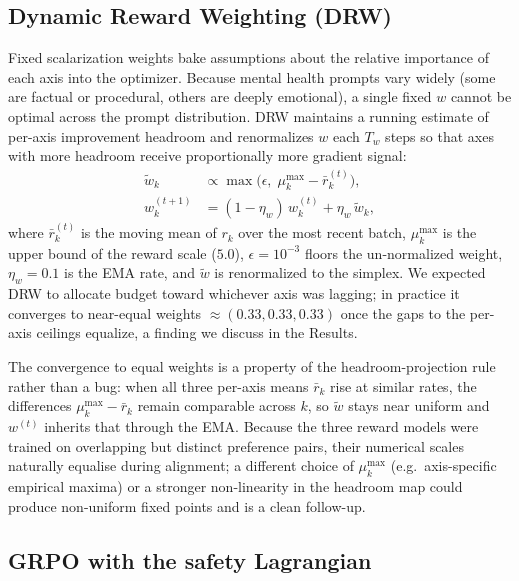\documentclass[10pt,twocolumn]{article}
\begin{document}
\subsection{Dynamic Reward Weighting (DRW)}

Fixed scalarization weights bake assumptions about the relative importance of each axis into the optimizer. Because mental health prompts vary widely (some are factual or procedural, others are deeply emotional), a single fixed $w$ cannot be optimal across the prompt distribution. DRW maintains a running estimate of per-axis improvement headroom and renormalizes $w$ each $T_w$ steps so that axes with more headroom receive proportionally more gradient signal:
\begin{align*}
  \tilde{w}_k &\propto \max\bigl(\epsilon,\; \mu_k^{\max} - \bar{r}_k^{(t)}\bigr), \\
  w_k^{(t+1)} &= (1 - \eta_w)\, w_k^{(t)} + \eta_w\, \tilde{w}_k,
\end{align*}
where $\bar{r}_k^{(t)}$ is the moving mean of $r_k$ over the most recent batch, $\mu_k^{\max}$ is the upper bound of the reward scale ($5.0$), $\epsilon = 10^{-3}$ floors the un-normalized weight, $\eta_w = 0.1$ is the EMA rate, and $\tilde{w}$ is renormalized to the simplex. We expected DRW to allocate budget toward whichever axis was lagging; in practice it converges to near-equal weights $\approx (0.33, 0.33, 0.33)$ once the gaps to the per-axis ceilings equalize, a finding we discuss in the Results.

The convergence to equal weights is a property of the headroom-projection rule rather than a bug: when all three per-axis means $\bar{r}_k$ rise at similar rates, the differences $\mu_k^{\max} - \bar{r}_k$ remain comparable across $k$, so $\tilde{w}$ stays near uniform and $w^{(t)}$ inherits that through the EMA. Because the three reward models were trained on overlapping but distinct preference pairs, their numerical scales naturally equalise during alignment; a different choice of $\mu_k^{\max}$ (e.g.\ axis-specific empirical maxima) or a stronger non-linearity in the headroom map could produce non-uniform fixed points and is a clean follow-up.

\subsection{GRPO with the safety Lagrangian}
\end{document}
